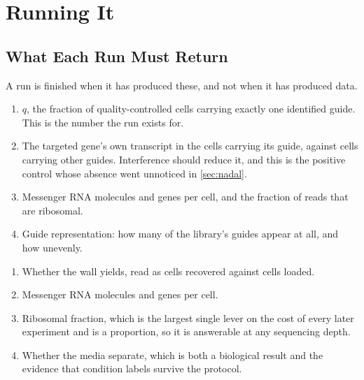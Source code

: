 
\section{Running It}
\label{sec:checkpoints}

\subsection{What Each Run Must Return}
\label{sec:returns}

A run is finished when it has produced these, and not when it has produced data.

\begin{enumerate}[leftmargin=1.6em,itemsep=2pt,topsep=2pt]
  \item $q$, the fraction of quality-controlled cells carrying exactly one
    identified guide. This is the number the run exists for.
  \item The targeted gene's own transcript in the cells carrying its guide,
    against cells carrying other guides. Interference should reduce it, and this
    is the positive control whose absence went unnoticed in \cref{sec:nadal}.
  \item Messenger RNA molecules and genes per cell, and the fraction of reads
    that are ribosomal.
  \item Guide representation: how many of the library's guides appear at all, and
    how unevenly.
\end{enumerate}

\begin{enumerate}[leftmargin=1.6em,itemsep=2pt,topsep=2pt]
  \item Whether the wall yields, read as cells recovered against cells loaded.
  \item Messenger RNA molecules and genes per cell.
  \item Ribosomal fraction, which is the largest single lever on the cost of
    every later experiment and is a proportion, so it is answerable at any
    sequencing depth.
  \item Whether the media separate, which is both a biological result and the
    evidence that condition labels survive the protocol.
\end{enumerate}

